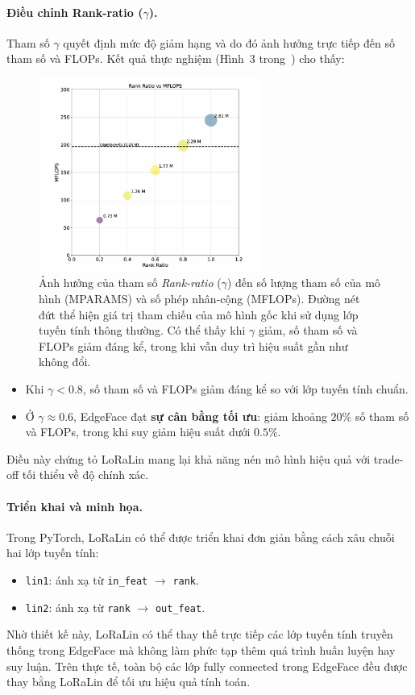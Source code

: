 \paragraph{Điều chỉnh Rank-ratio ($\gamma$).} 
Tham số $\gamma$ quyết định mức độ giảm hạng và do đó ảnh hưởng trực tiếp đến số tham số và FLOPs. Kết quả thực nghiệm (Hình~3 trong~\cite{george2024edgeface}) cho thấy:
\begin{figure}[ht]
    \centering
    \includegraphics[width=0.65\textwidth]{images/fig3.2.3.png} %
    \caption{Ảnh hưởng của tham số \textit{Rank-ratio} ($\gamma$) đến số lượng tham số của mô hình (MPARAMS) và số phép nhân-cộng (MFLOPs). 
    Đường nét đứt thể hiện giá trị tham chiếu của mô hình gốc khi sử dụng lớp tuyến tính thông thường. 
    Có thể thấy khi $\gamma$ giảm, số tham số và FLOPs giảm đáng kể, trong khi vẫn duy trì hiệu suất gần như không đổi.}
    \label{fig:lora_lin_rank}
    
\end{figure}

\begin{itemize}
    \item Khi $\gamma < 0.8$, số tham số và FLOPs giảm đáng kể so với lớp tuyến tính chuẩn.
    \item Ở $\gamma \approx 0.6$, EdgeFace đạt \textbf{sự cân bằng tối ưu}: giảm khoảng $20\%$ số tham số và FLOPs, trong khi suy giảm hiệu suất dưới $0.5\%$.
\end{itemize}
Điều này chứng tỏ LoRaLin mang lại khả năng nén mô hình hiệu quả với trade-off tối thiểu về độ chính xác.

\paragraph{Triển khai và minh họa.} 
Trong PyTorch, LoRaLin có thể được triển khai đơn giản bằng cách xâu chuỗi hai lớp tuyến tính:
\begin{itemize}
    \item \texttt{lin1}: ánh xạ từ \texttt{in\_feat} $\to$ \texttt{rank}.
    \item \texttt{lin2}: ánh xạ từ \texttt{rank} $\to$ \texttt{out\_feat}.
\end{itemize}
Nhờ thiết kế này, LoRaLin có thể thay thế trực tiếp các lớp tuyến tính truyền thống trong EdgeFace mà không làm phức tạp thêm quá trình huấn luyện hay suy luận. Trên thực tế, toàn bộ các lớp fully connected trong EdgeFace đều được thay bằng LoRaLin để tối ưu hiệu quả tính toán.

